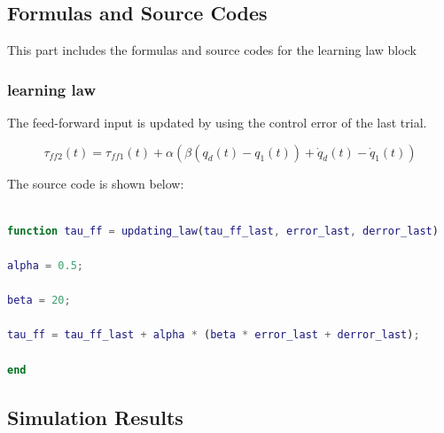 \documentclass{article}
\begin{document}
\subsection{Formulas and Source Codes}
This part includes the formulas and source codes for the learning law block
\subsubsection*{learning law}
The feed-forward input is updated by using the control error of the last trial.

$$
\tau_{ff2}(t) = \tau_{ff1}(t) + \alpha(\beta(q_d(t)-q_1(t))+\dot{q}_d(t)-\dot{q}_1(t))
$$
    

The source code is shown below:
\begin{lstlisting}[language=Matlab, basicstyle=\small\ttfamily]

function tau_ff = updating_law(tau_ff_last, error_last, derror_last)

alpha = 0.5;

beta = 20;

tau_ff = tau_ff_last + alpha * (beta * error_last + derror_last);

end

\end{lstlisting}


\subsection{Simulation Results}
\end{document}
